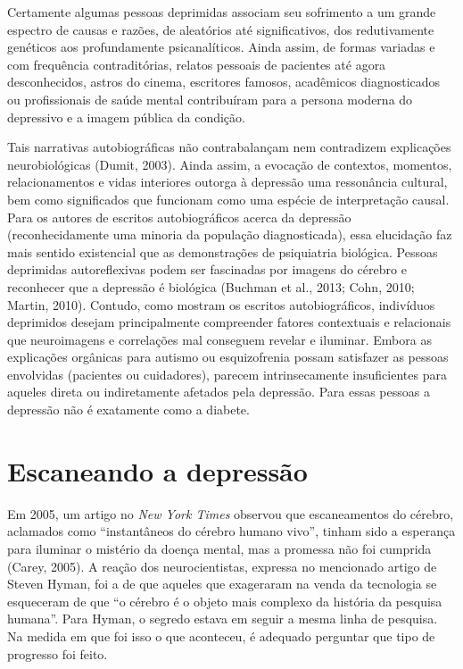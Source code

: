 Certamente algumas pessoas deprimidas associam seu sofrimento a um
grande espectro de causas e razões, de aleatórios até significativos,
dos redutivamente genéticos aos profundamente psicanalíticos. Ainda
assim, de formas variadas e com frequência contraditórias, relatos
pessoais de pacientes até agora desconhecidos, astros do cinema,
escritores famosos, acadêmicos diagnosticados ou profissionais de saúde
mental contribuíram para a persona moderna do depressivo e a imagem
pública da condição.

Tais narrativas autobiográficas não contrabalançam nem contradizem
explicações neurobiológicas (Dumit, 2003). Ainda assim, a evocação de
contextos, momentos, relacionamentos e vidas interiores outorga à
depressão uma ressonância cultural, bem como significados que funcionam
como uma espécie de interpretação causal. Para os autores de escritos
autobiográficos acerca da depressão (reconhecidamente uma minoria da
população diagnosticada), essa elucidação faz mais sentido existencial
que as demonstrações de psiquiatria biológica. Pessoas deprimidas
autoreflexivas podem ser fascinadas por imagens do cérebro e reconhecer
que a depressão é biológica (Buchman et al., 2013; Cohn, 2010; Martin,
2010). Contudo, como mostram os escritos autobiográficos, indivíduos
deprimidos desejam principalmente compreender fatores contextuais e
relacionais que neuroimagens e correlações mal conseguem revelar e
iluminar. Embora as explicações orgânicas para autismo ou esquizofrenia
possam satisfazer as pessoas envolvidas (pacientes ou cuidadores),
parecem intrinsecamente insuficientes para aqueles direta ou
indiretamente afetados pela depressão. Para essas pessoas a depressão
não é exatamente como a diabete.

\section{Escaneando a depressão}

Em 2005, um artigo no \emph{New York Times} observou que escaneamentos
do cérebro, aclamados como ``instantâneos do cérebro humano vivo'',
tinham sido a esperança para iluminar o mistério da doença mental, mas a
promessa não foi cumprida (Carey, 2005). A reação dos neurocientistas,
expressa no mencionado artigo de Steven Hyman, foi a de que aqueles que
exageraram na venda da tecnologia se esqueceram de que ``o cérebro é o
objeto mais complexo da história da pesquisa humana''. Para Hyman, o
segredo estava em seguir a mesma linha de pesquisa. Na medida em que foi
isso o que aconteceu, é adequado perguntar que tipo de progresso foi
feito.

